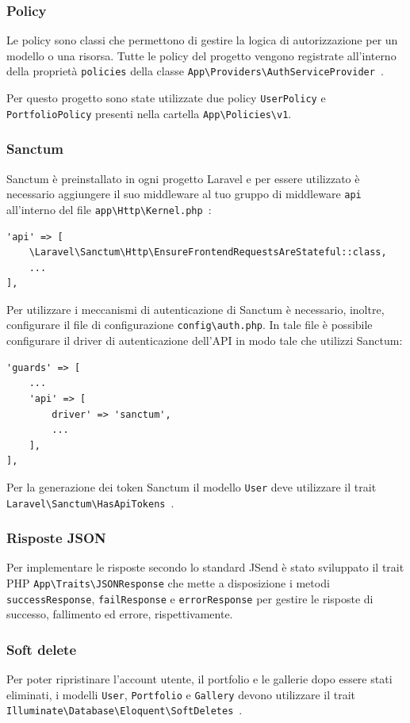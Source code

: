 \subsubsection{Policy}
Le policy sono classi che permettono di gestire la logica di autorizzazione per un modello o una risorsa. Tutte le policy del progetto vengono registrate all'interno della propriet\`a \verb|policies| della classe \sloppy\verb|App\Providers\AuthServiceProvider|\allowbreak~\cite{LaravelPolicy}.

Per questo progetto sono state utilizzate due policy \verb|UserPolicy| e \verb|PortfolioPolicy| presenti nella cartella \verb|App\Policies\v1|.

\subsubsection{Sanctum}
Sanctum \`e preinstallato in ogni progetto Laravel e per essere utilizzato \`e necessario aggiungere il suo middleware al tuo gruppo di middleware \verb|api| all'interno del file \verb|app\Http\Kernel.php|~\cite{LaravelSanctumConfig}:
\begin{lstlisting}
'api' => [
	\Laravel\Sanctum\Http\EnsureFrontendRequestsAreStateful::class,
	...
],
\end{lstlisting}

Per utilizzare i meccanismi di autenticazione di Sanctum \`e necessario, inoltre, configurare il file di configurazione \verb|config\auth.php|. In tale file \`e possibile configurare il driver di autenticazione dell'API in modo tale che utilizzi Sanctum:
\begin{lstlisting}[basicstyle=\ttfamily\fontsize{9pt}{9pt}\selectfont]
'guards' => [
	...
	'api' => [
		driver' => 'sanctum',
		...
	],
],
\end{lstlisting}

Per la generazione dei token Sanctum il modello \verb|User| deve utilizzare il trait \verb|Laravel\Sanctum\HasApiTokens|~\cite{LaravelSanctumConfig}.


\subsubsection{Risposte JSON}
Per implementare le risposte secondo lo standard JSend \`e stato sviluppato il trait PHP \verb|App\Traits\JSONResponse| che mette a disposizione i metodi \verb|successResponse|, \verb|failResponse| e \verb|errorResponse| per gestire le risposte di successo, fallimento ed errore, rispettivamente.
\subsubsection{Soft delete}
Per poter ripristinare l'account utente, il portfolio e le gallerie dopo essere stati eliminati, i modelli \verb|User|, \verb|Portfolio| e \verb|Gallery| devono utilizzare il trait \verb|Illuminate\Database\Eloquent\SoftDeletes|~\cite{LaravelSoftDeleting}.

